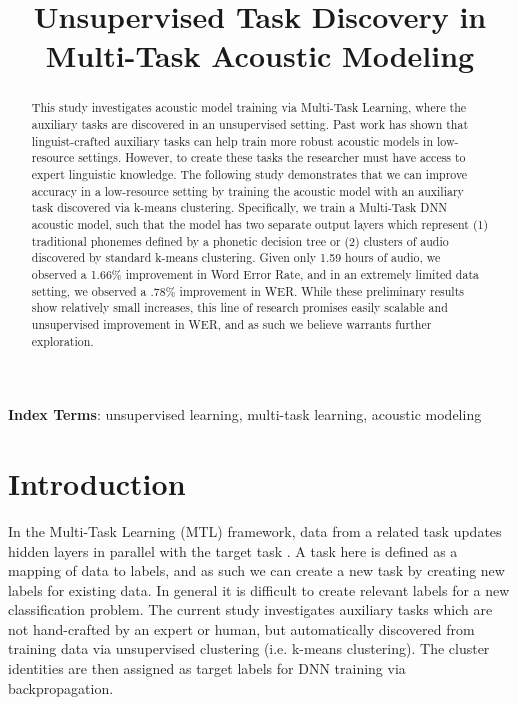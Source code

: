 \documentclass[a4paper]{article}
\title{Unsupervised Task Discovery in Multi-Task Acoustic Modeling}
\begin{document}
\maketitle
% 
\begin{abstract}

  This study investigates acoustic model training via Multi-Task Learning, where the auxiliary tasks are discovered in an unsupervised setting. Past work has shown that linguist-crafted auxiliary tasks can help train more robust acoustic models in low-resource settings. However, to create these tasks the researcher must have access to expert linguistic knowledge. The following study demonstrates that we can improve accuracy in a low-resource setting by training the acoustic model with an auxiliary task discovered via k-means clustering. Specifically, we train a Multi-Task DNN acoustic model, such that the model has two separate output layers which represent (1) traditional phonemes defined by a phonetic decision tree or (2) clusters of audio discovered by standard k-means clustering. Given only 1.59 hours of audio, we observed a 1.66\% improvement in Word Error Rate, and in an extremely limited data setting, we observed a .78\% improvement in WER. While these preliminary results show relatively small increases, this line of research promises easily scalable and unsupervised improvement in WER, and as such we believe warrants further exploration.

  
\end{abstract}

\noindent\textbf{Index Terms}: unsupervised learning, multi-task learning, acoustic modeling





\section{Introduction}

In the Multi-Task Learning (MTL) framework, data from a related task updates hidden layers in parallel with the target task \cite{caruana1997}. A task here is defined as a mapping of data to labels, and as such we can create a new task by creating new labels for existing data. In general it is difficult to create relevant labels for a new classification problem. The current study investigates auxiliary tasks which are not hand-crafted by an expert or human, but automatically discovered from training data via unsupervised clustering (i.e. k-means clustering). The cluster identities are then assigned as target labels for DNN training via backpropagation.
\end{document}
